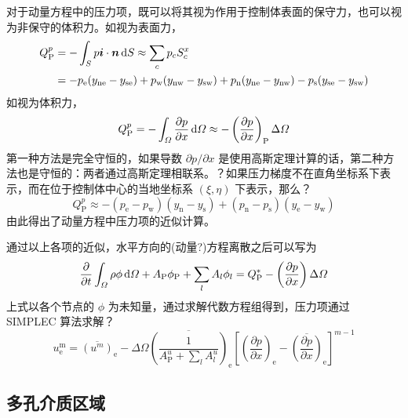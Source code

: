 对于动量方程中的压力项，既可以将其视为作用于控制体表面的保守力，也可以视为非保守的体积力。如视为表面力，
\begin{equation}
\begin{split}
	Q_{\mathrm{P}}^p &= -\int_S p\bm{i}\cdot\bm{n}\,\mathrm{d} S \approx
	\sum_c p_cS_c^x \\
	&= -p_{\mathrm{e}}(y_{\mathrm{ne}}-y_{\mathrm{se}}) +
	p_{\mathrm{w}}(y_{\mathrm{nw}}-y_{\mathrm{sw}}) +
	p_{\mathrm{n}}(y_{\mathrm{ne}}-y_{\mathrm{nw}}) -
	p_{\mathrm{s}}(y_{\mathrm{se}}-y_{\mathrm{sw}})
\end{split}
\end{equation}
如视为体积力，
\begin{equation}
	Q_{\mathrm{P}}^p = 
	-\int_{\varOmega} \frac{\partial p}{\partial x} \,\mathrm{d}\varOmega \approx 
	-\left(\frac{\partial p}{\partial x}\right)_{\mathrm{P}} \Delta\varOmega
\end{equation}
第一种方法是完全守恒的，如果导数 $\partial p/\partial x$ 是使用高斯定理计算的话，第二种方法也是守恒的：两者通过高斯定理相联系。？如果压力梯度不在直角坐标系下表示，而在位于控制体中心的当地坐标系 $(\xi,\eta)$ 下表示，那么？
\begin{equation}
	Q_{\mathrm{P}}^p \approx 
	-(p_{\mathrm{e}}-p_{\mathrm{w}})(y_{\mathrm{n}}-y_{\mathrm{s}}) + 
	(p_{\mathrm{n}}-p_{\mathrm{s}})(y_{\mathrm{e}}-y_{\mathrm{w}})
\end{equation}
由此得出了动量方程中压力项的近似计算。

通过以上各项的近似，水平方向的(动量?)方程离散之后可以写为
\begin{equation}
	\frac{\partial}{\partial t}\int_{\varOmega}\rho\phi\,\mathrm{d}\varOmega +
	A_{\mathrm{P}}\phi_{\mathrm{P}} + \sum_l A_l\phi_l = Q_{\mathrm{P}}^* - \left(\frac{\partial p}{\partial x}\right) \Delta\varOmega
\end{equation}
上式以各个节点的 $\phi$ 为未知量，通过求解代数方程组得到，压力项通过 SIMPLEC 算法求解？\cite{}
\begin{equation}\label{eq: Simplec}
	u_{\mathrm{e}}^{\mathrm{m}} = \overline{(u^m)}_{\mathrm{e}} - \Delta\varOmega \overline{\left(\frac{1}{A_{\mathrm{P}}^u+\sum_lA_l^u}\right)}_{\mathrm{e}} \left[\left(\frac{\partial p}{\partial x}\right)_{\mathrm{e}}-\overline{\left(\frac{\partial p}{\partial x}\right)}_{\mathrm{e}}\right]^{m-1}
\end{equation}

\subsection{多孔介质区域}

